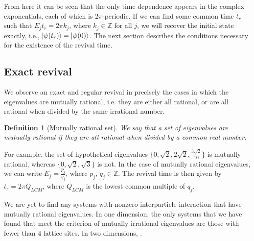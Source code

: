 \documentclass[a4paper,10pt]{article}
\theoremstyle{plain}
\newtheorem{definition}[]{Definition}
\begin{document}
From here it can be seen that the only time dependence appears in the complex 
exponentials, each of which is $2\pi$-periodic. If we can find some common 
time $t_r$ such that $E_{j} t_{r}=2 \pi k_{j}$, where $k_{j} \in \mathbb{Z} $ 
for all $j$, we will recover the initial state exactly, i.e., 
$\ket{\psi(t_{r})}=\ket{\psi(0)}$. The next section describes the conditions 
necessary for the existence of the revival time.\\


\subsection{Exact revival}

We observe an exact and regular revival in precisely the cases in which the
eigenvalues are mutually rational, i.e. they are either all rational, or are all
rational when divided by the same irrational number.
\begin{definition}[Mutually rational set]
    We say that a set of eigenvalues are mutually rational if they are all
    rational when divided by a common real number.
\end{definition}

For example, the set of
hypothetical eigenvalues $\lbrace 0, \sqrt{2}, 2 \sqrt{2}, \frac{3 \sqrt{2}}{10}
\rbrace$ is mutually rational, whereas $\lbrace 0, \sqrt{2}, \sqrt{3}\rbrace$ is
not. In the case of mutually rational eigenvalues, we can write $E_{j} =
\frac{p_{j}}{q_{j}}$, where $p_{j}$, $q_{j} \in \mathbb{Z}$. The revival time is
then given by $t_{r} = 2\pi Q_{LCM}$, where $Q_{LCM}$ is the lowest common
multiple of ${q_j}$.

We are yet to find any systems with nonzero interparticle interaction that have
mutually rational eigenvalues. In one dimension, the only systems that we have
found that meet the criterion of mutually irrational eigenvalues are those with
fewer than $4$ lattice sites. In two dimensions, .
\end{document}
